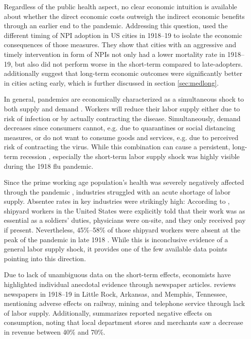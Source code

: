 \documentclass[12pt,a4paper]{article}
\begin{document}
Regardless of the public health aspect, no clear economic intuition is available about whether the direct economic costs outweigh the indirect economic benefits through an earlier end to the pandemic.
Addressing this question, \cite{correiaPandemicsDepressEconomy2020} used the different timing of NPI adoption in US cities in 1918--19 to isolate the economic consequences of those measures.
They show that cities with an aggressive and timely intervention in form of NPIs not only had a lower mortality rate in 1918--19, but also did not perform worse in the short-term compared to late-adopters.
\cite{correiaPandemicsDepressEconomy2020} additionally suggest that long-term economic outcomes were significantly better in cities acting early, which is further discussed in section \ref{sec:medlong}.

In general, pandemics are economically characterized as a simultaneous shock to both supply and demand \citep{eichenbaumMacroeconomicsEpidemics2020}.
Workers will reduce their labor supply either due to risk of infection or by actually contracting the disease.
Simultaneously, demand decreases since consumers cannot, e.g. due to quarantines or social distancing measures, or do not want to consume goods and services, e.g. due to perceived risk of contracting the virus.
While this combination can cause a persistent, long-term recession \citep{eichenbaumMacroeconomicsEpidemics2020}, especially the short-term labor supply shock was highly visible during the 1918 flu pandemic.

Since the prime working age population's health was severely negatively affected through the pandemic \citep{taubenberger1918InfluenzaMother2006}, industries struggled with an acute shortage of labor supply.
Absentee rates in key industries were strikingly high: According to \cite{barryPandemicsAvoidingMistakes2009}, 
shipyard workers in the United States were explicitly told that their work was as essential as a soldiers' duties, physicians were on-site, and they only received pay if present.
Nevertheless, 45\%--58\% of those shipyard workers were absent at the peak of the pandemic in late 1918 \citep{turnerReportPreventiveMeasure1919}.
While this is inconclusive evidence of a general labor supply shock, it provides one of the few available data points pointing into this direction.

Due to lack of unambiguous data on the short-term effects, economists have highlighted individual anecdotal evidence through newspaper articles.
\cite{garrettEconomicEffects19182007} reviews newspapers in 1918--19 in Little Rock, Arkansas, and Memphis, Tennessee, mentioning adverse effects on railway, mining and telephone service through lack of labor supply.
Additionally, \cite{garrettEconomicEffects19182007} summarizes reported negative effects on consumption, noting that local department stores and merchants saw a decrease in revenue between 40\% and 70\%.
\end{document}
